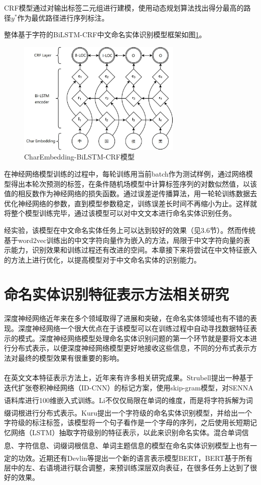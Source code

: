 \documentclass[winfonts,master,oneside,nobackinfo]{njuthesis}
\newcommand{\upcite}[1]{\textsuperscript{\textsuperscript{\cite{#1}}}}
\begin{document}
CRF模型通过对输出标签二元组进行建模，使用动态规划算法找出得分最高的路径$y^{*}$作为最优路径进行序列标注。

整体基于字符的BiLSTM-CRF中文命名实体识别模型框架如图\ref{CE-BiLSTM-CRF}。

\begin{figure}[h]
\centering
\includegraphics[width=0.7\textwidth]{./figure/CE-LSTM-CRF.jpg}
\caption{CharEmbedding-BiLSTM-CRF模型}
\label{CE-BiLSTM-CRF}
\end{figure}

在神经网络模型训练的过程中，每轮训练用当前batch作为测试样例，通过网络模型得出本轮次预测的标签，在条件随机场模型中计算标签序列的对数似然值，以该值的相反数作为神经网络的损失函数。通过误差逆传播算法，用一轮轮训练数据去优化神经网络的参数，直到模型参数稳定，训练误差长时间不再缩小为止。这样就将整个模型训练完毕，通过该模型可以对中文文本进行命名实体识别任务。

经实验，该模型在中文命名实体任务上可以达到较好的效果（见3.6节）。然而传统基于word2vec训练出的中文字符向量作为嵌入的方法，局限于中文字符向量的表示能力，识别效果和训练过程还有改进的空间。本章接下来将尝试在中文特征嵌入的方法上进行优化，以提高模型对于中文命名实体的识别能力。

\section{命名实体识别特征表示方法相关研究}

深度神经网络近年来在多个领域取得了进展和突破，在命名实体领域也有不错的表现。深度神经网络一个很大优点在于该模型可以在训练过程中自动寻找数据特征表示的模式。深度神经网络模型处理命名实体识别问题的第一个环节就是要将文本进行分布式表示，以便深度神经网络模型更好地接收这些信息，不同的分布式表示方法对最终的模型效果有很重要的影响。

在英文文本特征表示方法上，近年来有许多相关研究成果。Strubell\upcite{Strubell}提出一种基于迭代扩张卷积神经网络（ID-CNN）的标记方案，使用skip-gram模型，对SENNA语料库进行100维嵌入式训练。Li\upcite{JLi}不仅仅局限在单词的维度，而是将字符拆解为词缀词根进行分布式表示。Kuru\upcite{Kuru}提出一个字符级的命名实体识别模型，并给出一个字符级的标注标签，该模型将一个句子看作是一个字母的序列，之后使用长短期记忆网络（LSTM）抽取字符级别的特征表示，以此来识别命名实体。混合单词信息、字符信息、词缀词根信息、单词主题信息的模型\upcite{Strubell,Jansson,Wei}在命名实体识别模型上也有一定的功效。近期还有Devlin等\upcite{Devlin}提出一个新的语言表示模型BERT，BERT基于所有层中的左、右语境进行联合调整，来预训练深层双向表征，在很多任务上达到了很好的效果。
\end{document}

